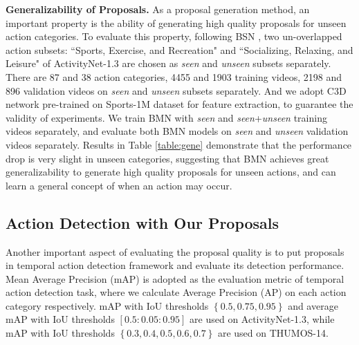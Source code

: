 \documentclass[10pt,twocolumn,letterpaper]{article}
\begin{document}
\noindent
\textbf{Generalizability of Proposals.}
%
As a proposal generation method, an important property is the ability of generating high quality proposals for unseen action categories.
%
To evaluate this property, following BSN \cite{lin2018bsn}, two un-overlapped action subsets: ``Sports, Exercise, and Recreation" and ``Socializing, Relaxing, and Leisure" of ActivityNet-1.3 are chosen as \emph{seen} and \emph{unseen} subsets separately. There are 87 and 38 action categories, 4455 and 1903 training videos, 2198 and 896 validation videos on \emph{seen} and \emph{unseen} subsets separately.
%
And we adopt C3D network \cite{tran2017convnet} pre-trained on Sports-1M dataset \cite{sports1m} for feature extraction, to guarantee the validity of experiments.
%
We train BMN with \emph{seen} and \emph{seen}+\emph{unseen} training videos separately, and evaluate both BMN models on \emph{seen} and \emph{unseen} validation videos separately.
%
Results in Table \ref{table:gene} demonstrate that the performance drop is very slight in unseen categories, suggesting that BMN achieves great generalizability to generate high quality proposals for unseen actions, and can learn a general concept of when an action may occur.






\subsection{Action Detection with Our Proposals}

Another important aspect of evaluating the proposal quality is to put proposals in temporal action detection framework and evaluate its detection performance.
%
Mean Average Precision (mAP) is adopted as the evaluation metric of temporal action detection task, where we calculate Average Precision (AP) on each action category respectively. mAP with IoU thresholds $\left \{0.5,0.75,0.95\right \}$ and average mAP with IoU thresholds $[0.5:0.05:0.95]$ are used on ActivityNet-1.3, while mAP with IoU thresholds $\left \{0.3,0.4,0.5,0.6,0.7 \right \}$ are used on THUMOS-14.
\end{document}
